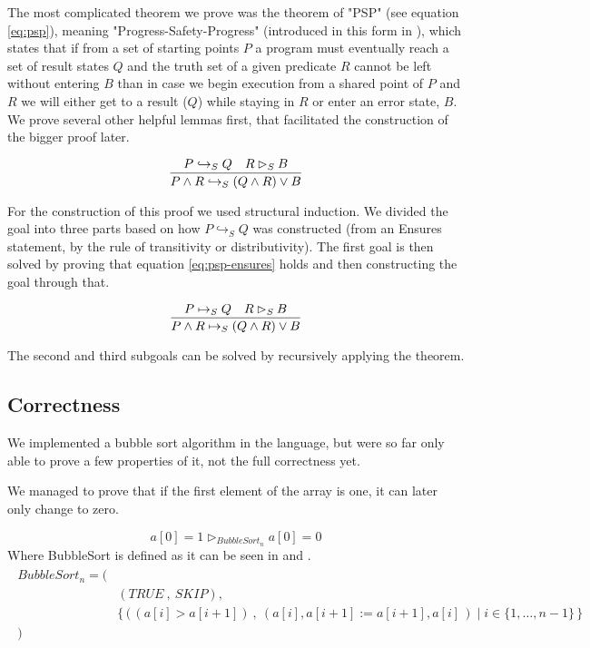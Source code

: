 The most complicated theorem we prove was the theorem of "PSP" (see equation \ref{eq:psp}), meaning "Progress-Safety-Progress" (introduced in this form in \cite{Chandy1988ParallelPD}), which states that if from a set of starting points $P$ a program must eventually reach a set of result states $Q$ and the truth set of a given predicate $R$ cannot be left without entering $B$ than in case we begin execution from a shared point of $P$ and $R$ we will either get to a result ($Q$) while staying in $R$ or enter an error state, $B$. We prove several other helpful lemmas first, that facilitated the construction of the bigger proof later.

\begin{equation}
    \label{eq:psp}
    \infer{P \land R \hookrightarrow_S (Q \land R) \lor B}{P \hookrightarrow_S Q & R \rhd_S B}
\end{equation}

For the construction of this proof we used structural induction. We divided the goal into three parts based on how $P \hookrightarrow_S Q$ was constructed (from an Ensures statement, by the rule of transitivity or distributivity). The first goal is then solved by proving that equation \ref{eq:psp-ensures} holds and then constructing the goal through that.

\begin{equation}
    \label{eq:psp-ensures}
    \infer{P \land R \mapsto_S (Q \land R) \lor B}{P \mapsto_S Q & R \rhd_S B}
\end{equation}

The second and third subgoals can be solved by recursively applying the theorem.

\subsection{Correctness}

We implemented a bubble sort algorithm in the language, but were so far only able to prove a few properties of it, not the full correctness yet.

We managed to prove that if the first element of the array is one, it can later only change to zero.

\begin{equation}
    \label{eq:bubble-proof-1}
    a[0] = 1 \rhd_{BubbleSort_n} a[0] = 0
\end{equation}
Where BubbleSort is defined as it can be seen in \cite{hz-orsi} and \cite{hz-article}.
\begin{align}
\begin{split}
    BubbleSort_n = ( & \\
      & (TRUE \:,\: SKIP), \\
      & \{ \, ( \, (a[i] > a[i+1])\:,\:(a[i],a[i+1]:= a[i+1],a[i] \, ) \; | \; i \in \{1,\dots,n-1\} \, \} \\
    ) &
\end{split}
\end{align}

